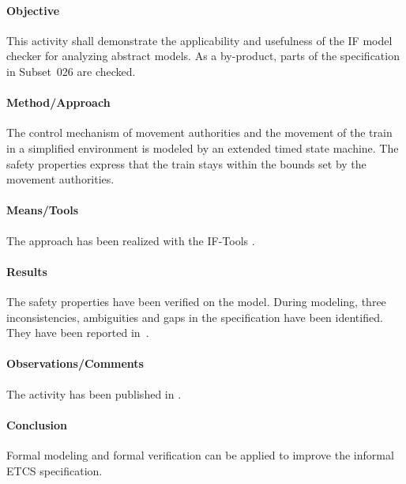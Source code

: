 \paragraph{Objective}

This activity shall demonstrate the applicability and usefulness of
the IF model checker for analyzing abstract models. As a by-product,
parts of the specification in Subset~026 are checked.   


\paragraph{Method/Approach}

The  control mechanism of movement authorities
and the movement of the train  in a simplified environment is modeled
by an extended timed state machine. The safety properties express that
the train stays within the bounds set by the movement authorities.

\paragraph{Means/Tools}

The approach has been realized with the IF-Tools \cite{IFTools14}.

\paragraph{Results}

The safety properties have been verified on the model. During
modeling, three inconsistencies, ambiguities and gaps in the
specification have been identified. They have been reported
in~\cite{specfindingsTSP}.

\paragraph{Observations/Comments}

The activity has been published in \cite{NgCa14}.

\paragraph{Conclusion}

Formal modeling and formal verification can be applied to improve the
informal ETCS specification. 